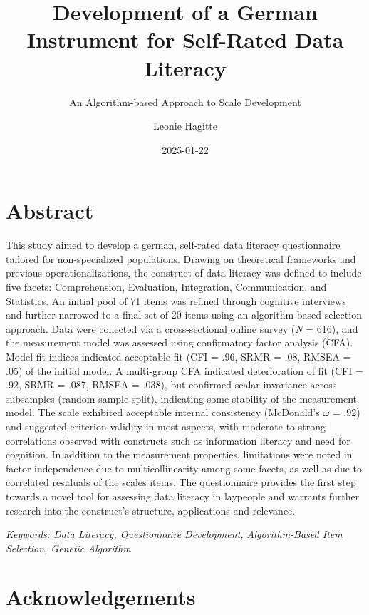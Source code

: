 \documentclass[
  12pt,
  a4paper,
  twoside]{article}
\title{Development of a German Instrument for Self-Rated Data Literacy}
\subtitle{An Algorithm-based Approach to Scale Development}
\author{Leonie Hagitte}
\date{2025-01-22}
\begin{document}
\maketitle

{
\setcounter{tocdepth}{2}
\tableofcontents
}
\newpage\null\thispagestyle{empty}\newpage

\section*{Abstract}\label{abstract}

This study aimed to develop a german, self-rated data literacy questionnaire tailored for non-specialized populations. Drawing on theoretical frameworks and previous operationalizations, the construct of data literacy was defined to include five facets: Comprehension, Evaluation, Integration, Communication, and Statistics. An initial pool of 71 items was refined through cognitive interviews and further narrowed to a final set of 20 items using an algorithm-based selection approach. Data were collected via a cross-sectional online survey (\emph{N} = 616), and the measurement model was assessed using confirmatory factor analysis (CFA). Model fit indices indicated acceptable fit (CFI = .96, SRMR = .08, RMSEA = .05) of the initial model. A multi-group CFA indicated deterioration of fit (CFI = .92, SRMR = .087, RMSEA = .038), but confirmed scalar invariance across subsamples (random sample split), indicating some stability of the measurement model. The scale exhibited acceptable internal consistency (McDonald's \(\omega\) = .92) and suggested criterion validity in most aspects, with moderate to strong correlations observed with constructs such as information literacy and need for cognition. In addition to the measurement properties, limitations were noted in factor independence due to multicollinearity among some facets, as well as due to correlated residuals of the scales items. The questionnaire provides the first step towards a novel tool for assessing data literacy in laypeople and warrants further research into the construct's structure, applications and relevance.

\emph{Keywords: Data Literacy, Questionnaire Development, Algorithm-Based Item Selection, Genetic Algorithm}

\section*{Acknowledgements}\label{acknowledgements}
\end{document}

